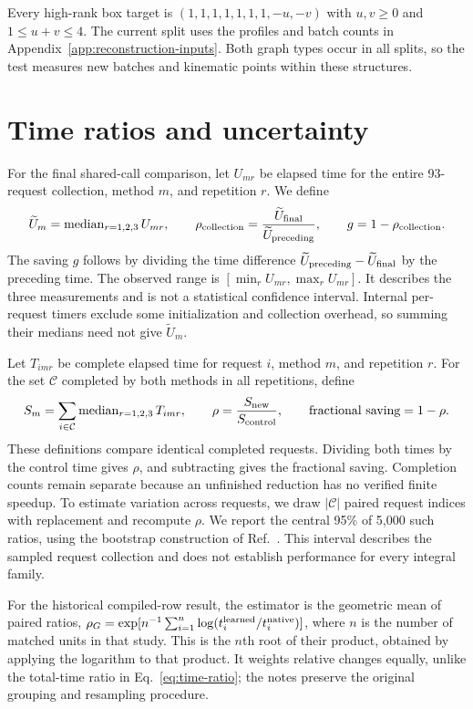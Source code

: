 Every high-rank box target is $(1,1,1,1,1,1,1,-u,-v)$ with $u,v\geq0$ and $1\leq u+v\leq4$. The current split uses the profiles and batch counts in Appendix~\ref{app:reconstruction-inputs}. Both graph types occur in all splits, so the test measures new batches and kinematic points within these structures.

\section{Time ratios and uncertainty}
\label{app:statistics}
For the final shared-call comparison, let $U_{mr}$ be elapsed time for the entire 93-request collection, method $m$, and repetition $r$. We define
\begin{equation}
 \widetilde U_m=\operatorname{median}_{r=1,2,3}U_{mr},\qquad
 \rho_{\rm collection}=\frac{\widetilde U_{\rm final}}{\widetilde U_{\rm preceding}},\qquad
 g=1-\rho_{\rm collection}.
 \label{eq:collection-ratio}
\end{equation}
The saving $g$ follows by dividing the time difference $\widetilde U_{\rm preceding}-\widetilde U_{\rm final}$ by the preceding time. The observed range is $[\min_r U_{mr},\max_r U_{mr}]$. It describes the three measurements and is not a statistical confidence interval. Internal per-request timers exclude some initialization and collection overhead, so summing their medians need not give $\widetilde U_m$.

Let $T_{imr}$ be complete elapsed time for request $i$, method $m$, and repetition $r$. For the set $\mathcal C$ completed by both methods in all repetitions, define
\begin{equation}
 S_m=\sum_{i\in\mathcal C}\operatorname{median}_{r=1,2,3}T_{imr},\qquad
 \rho=\frac{S_{\rm new}}{S_{\rm control}},\qquad
 \text{fractional saving}=1-\rho.
 \label{eq:time-ratio}
\end{equation}
These definitions compare identical completed requests. Dividing both times by the control time gives $\rho$, and subtracting gives the fractional saving. Completion counts remain separate because an unfinished reduction has no verified finite speedup. To estimate variation across requests, we draw $|\mathcal C|$ paired request indices with replacement and recompute $\rho$. We report the central 95\% of 5,000 such ratios, using the bootstrap construction of Ref.~\cite{Efron1979}. This interval describes the sampled request collection and does not establish performance for every integral family.


For the historical compiled-row result, the estimator is the geometric mean of paired ratios, $\rho_G=\exp[n^{-1}\sum_{i=1}^{n}\log(t_i^{\rm learned}/t_i^{\rm native})]$, where $n$ is the number of matched units in that study. This is the $n$th root of their product, obtained by applying the logarithm to that product. It weights relative changes equally, unlike the total-time ratio in Eq.~\eqref{eq:time-ratio}; the notes preserve the original grouping and resampling procedure.
